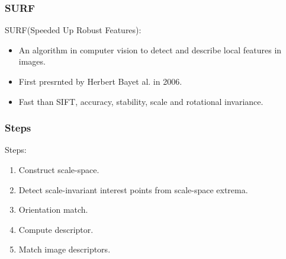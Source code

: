 \documentclass[notheorems, serif, table, compress]{beamer}  %
\begin{document}
\begin{frame}[fragile]
\frametitle{SURF}
SURF(Speeded Up Robust Features):
\begin{itemize}
\item An algorithm in computer vision to detect and describe local features in images. %

\item First presrnted by Herbert Bayet al. in 2006.

\item Fast than SIFT, accuracy, stability, scale and rotational invariance. 

\end{itemize}
\end{frame}

\begin{frame}[fragile]
\frametitle{Steps}

Steps:
\begin{enumerate}
\item Construct scale-space.

\item Detect scale-invariant interest points from scale-space extrema. %

\item Orientation match.%

\item Compute descriptor.%

\item Match image descriptors.%
\end{enumerate}
\end{frame}
\end{document}
